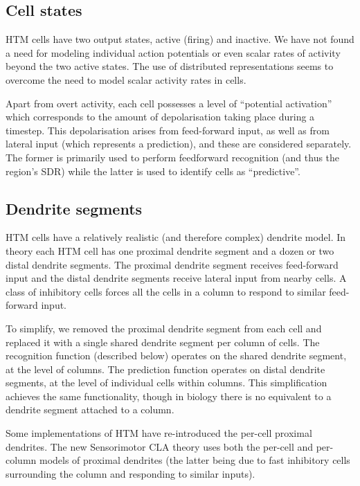 \subsection*{Cell states}

HTM cells have two output states, active (firing) and inactive. We have not
found a need for modeling individual action potentials or even scalar
rates of activity beyond the two active states. The use of distributed
representations seems to overcome the need to model scalar activity
rates in cells.

Apart from overt activity, each cell possesses a level of ``potential 
activation'' which corresponds to the amount of depolarisation taking place
during a timestep. This depolarisation arises from feed-forward input,
as well as from lateral input (which represents a prediction), and
these are considered separately. The former is primarily used to perform
feedforward recognition (and thus the region's SDR) while the latter is used
to identify cells as ``predictive''.

\subsection*{Dendrite segments}

HTM cells have a relatively realistic (and therefore complex) dendrite
model. In theory each HTM cell has one proximal dendrite segment and a
dozen or two distal dendrite segments. The proximal dendrite segment
receives feed-forward input and the distal dendrite segments receive
lateral input from nearby cells. A class of inhibitory cells forces
all the cells in a column to respond to similar feed-forward input. 

To simplify, we removed the proximal dendrite segment from each cell and
replaced it with a single shared dendrite segment per column of
cells. The recognition function (described below) operates on the
shared dendrite segment, at the level of columns. The prediction
function operates on distal dendrite segments, at the level of
individual cells within columns. This simplification achieves the same
functionality, though in biology there is no equivalent to a dendrite
segment attached to a column.

Some implementations of HTM have re-introduced the per-cell proximal 
dendrites. The new Sensorimotor CLA theory uses both the per-cell and per-column
models of proximal dendrites (the latter being due to fast inhibitory cells 
surrounding the column and responding to similar inputs).


